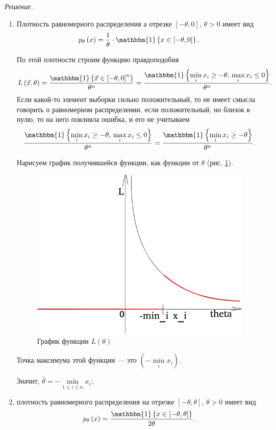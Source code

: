 \textit{Решение.}
\begin{enumerate}[label=\alph*)]
  \item Плотность равномерного распределения а отрезке $ \left[- \theta, 0 \right], \, \theta > 0$
  имеет вид
  $$p_{ \theta } \left( x \right) =
    \frac{1}{ \theta } \cdot \mathbbm{1} \left\{ x \in \left[ - \theta, 0 \right] \right\}.$$

  По этой плотности строим функцию правдоподобия
  $$L \left( \vec{x}, \theta \right) =
    \frac{ \mathbbm{1} \left\{ \vec{x} \in \left[ - \theta, 0 \right]^n \right\} }{ \theta^n} =
    \frac{ \mathbbm{1} \left\{ \min \limits_i x_i \geq - \theta, \, \max \limits_i x_i \leq 0 \right\} }{ \theta ^n}.$$
  Если какой-то элемент выборки сильно положительный,
  то не имеет смысла говорить о равномерном распределении, если положительный, но близок к нулю,
  то на него повлияла ошибка, и его не учитываем
  $$ \frac{ \mathbbm{1} \left\{ \min \limits_i x_i \geq - \theta, \, \max \limits_i x_i \leq 0 \right\} }{ \theta ^n} =
    \frac{ \mathbbm{1} \left\{ \min \limits_i x_i \geq - \theta \right\} }{ \theta^n}.$$

  Нарисуем график получившейся функции, как функции от $ \theta $ (рис. \ref{fig:418}).
  \begin{figure}[h!]
    \centering
    \includegraphics[width=.4\textwidth]{./pictures/4_18.png}
    \caption{График функции $L \left( \theta \right) $}
    \label{fig:418}
  \end{figure}

  Точка максимума этой функции --- это $ \left( - \min \limits_i x_i \right) $.

  Значит, $ \hat{ \theta } = - \min \limits_{1 \leq i \leq n} x_i$;
  \item плотность равномерного распределения на отрезке
  $ \left[- \theta, \theta \right], \, \theta > 0$ имеет вид
  $$p_{ \theta } \left( x \right) =
    \frac{ \mathbbm{1} \left\{ x \in \left[ - \theta, \theta \right] \right\} }{2 \theta }.$$


\end{enumerate}
